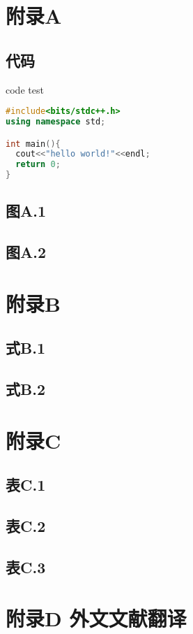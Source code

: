 \appendix
\chapter{附录A}

\section{代码}

code test

\begin{lstlisting}[title=Hello World, language=C++]
#include<bits/stdc++.h>
using namespace std;

int main(){
  cout<<"hello world!"<<endl;
  return 0;
}

\end{lstlisting}


\section*{图A.1}

\section*{图A.2}

\chapter{附录B}
\section*{式B.1}

\section*{式B.2}

\chapter{附录C}
\section*{表C.1}

\section*{表C.2}

\section*{表C.3}

\chapter{附录D 外文文献翻译}
